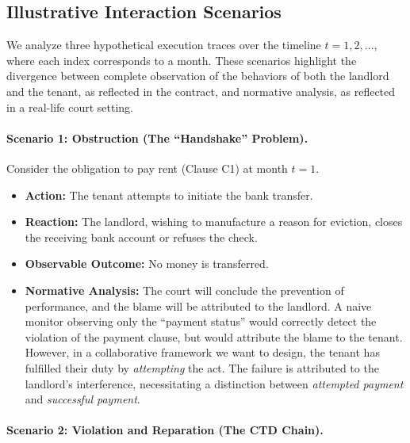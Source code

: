 \subsection{Illustrative Interaction Scenarios}

We analyze three hypothetical execution traces over the timeline $t=1, 2, \dots$, where each index corresponds to a month. These scenarios highlight the divergence between complete observation of the behaviors of both the landlord and the tenant, as reflected in the contract, and normative analysis, as reflected in a real-life court setting.



\paragraph{Scenario 1: Obstruction (The ``Handshake'' Problem).}

Consider the obligation to pay rent (Clause C1) at month $t=1$.

\begin{itemize}

    \item \textbf{Action:} The tenant attempts to initiate the bank transfer.

    \item \textbf{Reaction:} The landlord, wishing to manufacture a reason for eviction, closes the receiving bank account or refuses the check.

    \item \textbf{Observable Outcome:} No money is transferred.

    \item \textbf{Normative Analysis:} The court will conclude the prevention of performance, and the blame will be attributed to the landlord. A naive monitor observing only the ``payment status'' would correctly detect the violation of the payment clause, but would attribute the blame to the tenant. However, in a collaborative framework we want to design, the tenant has fulfilled their duty by \emph{attempting} the act. The failure is attributed to the landlord's interference, necessitating a distinction between \emph{attempted payment} and \emph{successful payment}.

\end{itemize}



\paragraph{Scenario 2: Violation and Reparation (The CTD Chain).}

